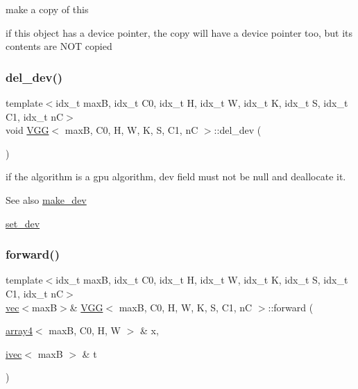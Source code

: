 make a copy of this 

if this object has a device pointer, the copy will have a device pointer too, but its contents are N\+OT copied \mbox{\label{structVGG_ab3bcd5bb62b66713f5bf0ba3c8b539cb}} 
\subsubsection{\texorpdfstring{del\+\_\+dev()}{del\_dev()}}
{\footnotesize\ttfamily template$<$idx\+\_\+t maxB, idx\+\_\+t C0, idx\+\_\+t H, idx\+\_\+t W, idx\+\_\+t K, idx\+\_\+t S, idx\+\_\+t C1, idx\+\_\+t nC$>$ \\
void \hyperlink{structVGG}{V\+GG}$<$ maxB, C0, H, W, K, S, C1, nC $>$\+::del\+\_\+dev (\begin{DoxyParamCaption}{ }\end{DoxyParamCaption})\hspace{0.3cm}{\ttfamily [inline]}}



if the algorithm is a gpu algorithm, dev field must not be null and deallocate it. 

\begin{DoxySeeAlso}{See also}
\hyperlink{structVGG_a26e977db7cff56b6bd9e2a8183635551}{make\+\_\+dev} 

\hyperlink{structVGG_a07e0570fe0eb7152dee4eff0c0bcc86f}{set\+\_\+dev} 
\end{DoxySeeAlso}
\mbox{\label{structVGG_a256a1792818900ab2023554cea1ebb31}} 
\subsubsection{\texorpdfstring{forward()}{forward()}}
{\footnotesize\ttfamily template$<$idx\+\_\+t maxB, idx\+\_\+t C0, idx\+\_\+t H, idx\+\_\+t W, idx\+\_\+t K, idx\+\_\+t S, idx\+\_\+t C1, idx\+\_\+t nC$>$ \\
\hyperlink{structvec}{vec}$<$maxB$>$\& \hyperlink{structVGG}{V\+GG}$<$ maxB, C0, H, W, K, S, C1, nC $>$\+::forward (\begin{DoxyParamCaption}\item[{\hyperlink{structarray4}{array4}$<$ maxB, C0, H, W $>$ \&}]{x,  }\item[{\hyperlink{structivec}{ivec}$<$ maxB $>$ \&}]{t }\end{DoxyParamCaption})\hspace{0.3cm}{\ttfamily [inline]}}



